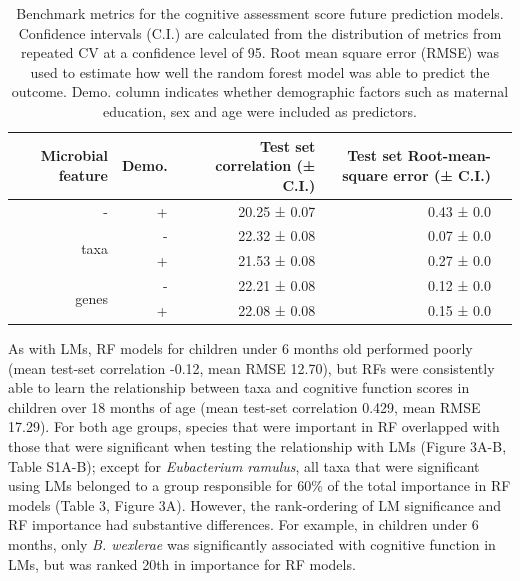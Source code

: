 \documentclass{article}
\begin{document}
\begin{table}[!h]
    \begin{center}
    \begin{tabular}{|r|r|r|r|r}
        \hline
        \textbf{Microbial feature} & \textbf{Demo.} & \textbf{Test set correlation (± C.I.)} & \textbf{Test set Root-mean-square error (± C.I.)} \\\hline
        - & + & 20.25 ± 0.07 & 0.43 ± 0.0 \\ \cline{1-4}
        \multirow{2}{*}{taxa} & - & 22.32 ± 0.08 & 0.07 ± 0.0 \\ \cline{2-4}
            & + & 21.53 ± 0.08 & 0.27 ± 0.0 \\ \cline{1-4}
        \multirow{2}{*}{genes} & - & 22.21 ± 0.08 & 0.12 ± 0.0 \\ \cline{2-4}
            & + & 22.08 ± 0.08 & 0.15 ± 0.0 \\\hline\hline
    \end{tabular}
    \caption{\label{tab:rfbench}Benchmark metrics for the cognitive assessment score
    future prediction models. Confidence intervals (C.I.) are calculated from the
    distribution of metrics from repeated CV at a confidence level of 95.
    Root mean square error (RMSE) was used to estimate how well the random forest model was able to predict the outcome.
    Demo. column indicates whether demographic factors such as maternal education, sex and age were included as predictors.}
    \end{center}
\end{table}

As with LMs, RF models for children under 6 months old
performed poorly (mean test-set correlation -0.12, mean RMSE 12.70),
but RFs were consistently able to learn the relationship between taxa
and cognitive function scores in children over 18 months of age (mean
test-set correlation 0.429, mean RMSE 17.29). For both age groups,
species that were important in RF overlapped with those that were
significant when testing the relationship with LMs (Figure
3A-B, Table S1A-B); except for \emph{Eubacterium ramulus},
all taxa that were significant using LMs belonged to a group
responsible for 60\% of the total importance in RF models
(Table 3, Figure 3A).
However, the rank-ordering of LM significance and RF importance
had substantive differences. For example, in children under 6 months,
only \emph{B. wexlerae} was significantly associated with cognitive function in LMs, but
was ranked 20th in importance for RF models. 
\end{document}
